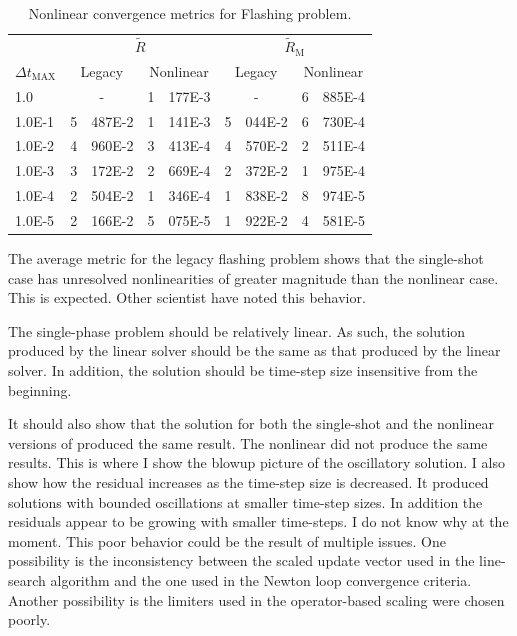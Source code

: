 \begin{table}[h!t]
\centering
\begin{tabular}{@{}l r@{.}l r@{.}l r@{.}l r@{.}l @{}}
\toprule
& \multicolumn{4}{c}{$\tilde{R}$} & \multicolumn{4}{c}{$\tilde{R}_{\text{M}}$}  \\
$\Delta t_{\text{MAX}}$ & \multicolumn{2}{c}{Legacy} & \multicolumn{2}{c}{Nonlinear} & \multicolumn{2}{c}{Legacy}& \multicolumn{2}{c}{Nonlinear}  \\
\midrule
1.0    & \multicolumn{2}{c}{-} & 1&177E-3 & \multicolumn{2}{c}{-} & 6&885E-4 \\
1.0E-1 & 5&487E-2 & 1&141E-3 & 5&044E-2 & 6&730E-4 \\
1.0E-2 & 4&960E-2 & 3&413E-4 & 4&570E-2 & 2&511E-4 \\
1.0E-3 & 3&172E-2 & 2&669E-4 & 2&372E-2 & 1&975E-4 \\
1.0E-4 & 2&504E-2 & 1&346E-4 & 1&838E-2 & 8&974E-5 \\
1.0E-5 & 2&166E-2 & 5&075E-5 & 1&922E-2 & 4&581E-5 \\
\bottomrule  
\end{tabular}
\caption{Nonlinear convergence metrics for Flashing problem.}
\label{tab:flashing_criteria}
\end{table}

The average metric for the legacy flashing problem shows that the single-shot case has unresolved nonlinearities of greater magnitude than the nonlinear case.
This is expected.
Other scientist have noted this behavior.

The single-phase problem should be relatively linear.
As such, the solution produced by the linear solver should be the same as that produced by the linear solver.
In addition, the solution should be time-step size insensitive from the beginning.

It should also show that the solution for both the single-shot and the nonlinear versions of \cobra{} produced the same result.
The nonlinear \cobra{} did not produce the same results.
This is where I show the blowup picture of the oscillatory solution.
I also show how the residual increases as the time-step size is decreased.
It produced solutions with bounded oscillations at smaller time-step sizes.
In addition the residuals appear to be growing with smaller time-steps.
I do not know why at the moment.
This poor behavior could be the result of multiple issues.
One possibility is the inconsistency between the scaled update vector used in the line-search algorithm and  the one used in the Newton loop convergence criteria.
Another possibility is the limiters used in the operator-based scaling were chosen poorly.

